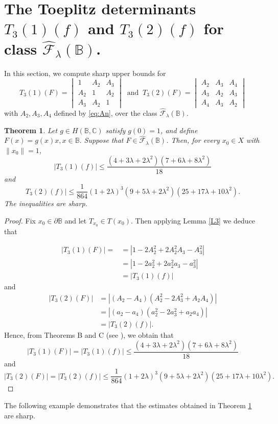 \documentclass[11pt, reqno]{amsart}
\newtheorem{theo}{Theorem}[section]
\numberwithin{equation}{section}
\begin{document}
\section{{\bf The Toeplitz determinants $T_3(1)(f)$ and $T_3(2)(f)$ for class $\widehat{\mathcal{F}}_{\lambda}(\mathbb{B})$.}}
In this section, we compute sharp upper bounds for 
\[
T_3(1)(F)
=
\begin{vmatrix}
1 & A_2 & A_3\\
A_2 & 1 & A_2\\
A_3 & A_2 & 1
\end{vmatrix}\;\;
\text{and}\;\;
T_3(2)(F)
=
\begin{vmatrix}
A_2 & A_3 & A_4\\
A_3 & A_2 & A_3\\
A_4 & A_3 & A_2
\end{vmatrix}
\]
with  $A_{2},A_{3},A_{4}$ defined by
\eqref{eq:An},
over the class $\widehat{\mathcal{F}}_{\lambda}(\mathbb{B})$.
\begin{theo}\label{T1}
Let $g\in H(\mathbb{B},\mathbb{C})$ satisfy $g(0)=1$, and define $F(x)=g(x)x, x\in\mathbb{B}.$
Suppose that $F\in\widehat{\mathcal{F}}_{\lambda}(\mathbb{B})$. Then, for every
$x_{0}\in X$ with $\|x_{0}\|=1$,
\[
|T_3(1)(f)|\leq  \frac{(4+3\lambda+2\lambda^2)(7+6\lambda+8\lambda^2)}{18}
\]
 and
 \[ T_3(2)(f)|\leq \frac{1}{864}(1+2\lambda)^3(9+5\lambda+2\lambda^2)(25+17\lambda+10\lambda^2).
\]
 The inequalities are sharp.
\end{theo}
\begin{proof} Fix $x_0\in \partial{\mathbb{B}}$ and let $T_{x_0}\in T(x_0)$. Then applying Lemma \ref{L3} we deduce that 

\begin{align*}
|T_3(1)(F)|=
&=|1-2A_2^2+2A_2^2A_3-A_3^2|\\
&=|1-2a_2^2+2a_2^2a_3-a_3^2|\\
&=|T_3(1)(f)|
\end{align*}
and 
\begin{align*}
|T_3(2)(F)|
&=\left|(A_2-A_4)(A_2^2-2A_3^2+A_2A_4)\right|\\
&=\left|(a_2-a_4)(a_2^2-2a_3^2+a_2a_4)\right|\\
&=|T_3(2)(f)|.
\end{align*}
Hence, from Theorems B and C (see \cite[Theorem 4.2, Theorem 4.3]{ALT2022}), we obtain that
\[ |T_3(1)(F)|=|T_3(1)(f)|\leq \frac{(4+3\lambda+2\lambda^2)(7+6\lambda+8\lambda^2)}{18}\]
and 
\[ |T_3(2)(F)|=|T_3(2)(f)| \leq \frac{1}{864}(1+2\lambda)^3(9+5\lambda+2\lambda^2)(25+17\lambda+10\lambda^2).\]
\end{proof}
The following example demonstrates that the estimates obtained in Theorem \ref{T1} are sharp.
\end{document}
